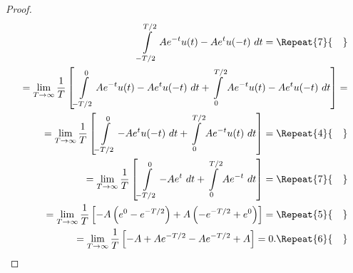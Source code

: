 \documentclass[12pt,oneside,openany]{memoir}
\numberwithin{equation}{subsection}
\newcommand{\quads}[1]{\Repeat{#1}{\quad}}
\newcommand{\dt}{\ dt}
\begin{document}
\begin{proof}
\begin{equation}
\begin{split}
	\int\displaylimits_{-T/2}^{T/2} A e^{-t} u(t) - A e^{t} u(-t) \dt =
	\quads{7}
	\\
	= \lim_{T \rightarrow \infty} \frac{1}{T} \left[
		\int\displaylimits_{-T/2}^{0} A e^{-t} u(t) - A e^{t} u(-t) \dt
		+ \int\displaylimits_{0}^{T/2} A e^{-t} u(t) - A e^{t} u(-t) \dt
	\right] =
	\\
	= \lim_{T \rightarrow \infty} \frac{1}{T} \left[
		\int\displaylimits_{-T/2}^{0} - A e^{t} u(-t) \dt +
		\int\displaylimits_{0}^{T/2} A e^{-t} u(t) \dt
	\right] =
	\quads{4}
	\\
	= \lim_{T \rightarrow \infty} \frac{1}{T} \left[
		\int\displaylimits_{-T/2}^{0} - A e^{t} \dt +
		\int\displaylimits_{0}^{T/2} A e^{-t} \dt
	\right] =
	\quads{7}
	\\
	= \lim_{T \rightarrow \infty} \frac{1}{T} \left[
		-A \left(e^0 - e^{-T/2}\right) + A \left(-e^{-T/2} + e^0\right)
	\right] =
	\quads{5}
	\\
	= \lim_{T \rightarrow \infty} \frac{1}{T} \left[
		-A + Ae^{-T/2} - Ae^{-T/2} + A
	\right] = 0.
	\quads{6}
\end{split}
\end{equation}
\end{proof}


\newpage
\end{document}
